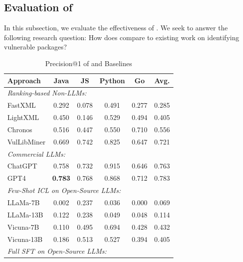 \subsection{Evaluation of \detector{}~\label{sec: trade off}}

In this subsection, we evaluate the effectiveness of \detector{}. We seek to answer the following research question: How does \detector{} compare to existing work on identifying vulnerable packages? 

\begin{table}[t]
\centering
\caption{Precision@1 of \detector{} and Baselines}
\label{tab: baseline cmp}
\small
\begin{threeparttable}
\begin{tabular}{lccccc}
\toprule
Approach     & Java    & JS     & Python & Go  & Avg.   \\
\midrule
\multicolumn{5}{l}{\textit{Ranking-based Non-LLMs:}}               \\
FastXML       & 0.292   & 0.078  & 0.491  & 0.277 & 0.285 \\
LightXML      & 0.450   & 0.146  & 0.529  & 0.494 & 0.405 \\
Chronos       & 0.516   & 0.447  & 0.550  & 0.710 & 0.556 \\
VulLibMiner   & 0.669   & 0.742  & 0.825  & 0.647 & 0.721 \\
\midrule
\multicolumn{5}{l}{\textit{Commercial LLMs:}} &              \\
ChatGPT       & 0.758   & 0.732  & 0.915  & 0.646  & 0.763\\
GPT4          & \textbf{0.783}   & 0.768  & 0.868  & 0.712 & 0.783 \\
\midrule
\multicolumn{5}{l}{\textit{Few-Shot ICL on Open-Source LLMs:}} & \\
LLaMa-7B      & 0.002   & 0.237  & 0.036  & 0.000 & 0.069 \\
LLaMa-13B     & 0.122   & 0.238  & 0.049  & 0.048 & 0.114 \\
Vicuna-7B     & 0.110   & 0.495  & 0.694  & 0.428 & 0.432 \\
Vicuna-13B    & 0.186   & 0.513  & 0.527  & 0.394 & 0.405 \\
\midrule
\multicolumn{5}{l}{\textit{Full SFT on Open-Source LLMs:}} &   \\

\end{tabular}
\end{threeparttable}
\end{table}
